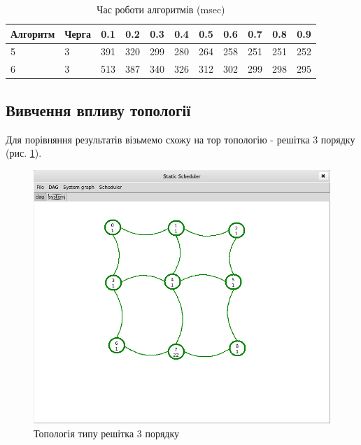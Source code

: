 \begin{table}[H]
\caption{Час роботи алгоритмів (msec)}
\label{tab:big_table}
\centering
\begin{tabular}{llrrrrrrrrr}
\toprule
Алгоритм & Черга &   0.1 &   0.2 &   0.3 &   0.4 &   0.5 &   0.6 &   0.7 &   0.8 &   0.9 \\
\midrule
5 & 3 & 391 & 320 & 299 & 280 & 264 & 258 & 251 & 251 & 252 \\
6 & 3 & 513 & 387 & 340 & 326 & 312 & 302 & 299 & 298 & 295 \\
\bottomrule
\end{tabular}
\end{table}

\subsection{Вивчення впливу топології}

Для порівняння результатів візьмемо схожу на тор топологію - решітка 3 порядку (рис. \ref{fig:grid}).

    \begin{figure}[h!]
      \begin{center}
        \includegraphics[width=\textwidth]{res/grid.png}
      \end{center}
      \caption{Топологія типу решітка 3 порядку}
    \label{fig:grid}
    \end{figure}
